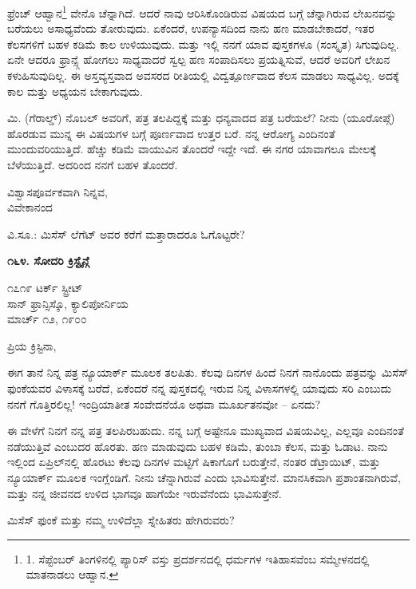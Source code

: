 ಫ್ರೆಂಚ್ ಆಹ್ವಾನ\footnote{1. ಸೆಪ್ಟೆಂಬರ್ ತಿಂಗಳಿನಲ್ಲಿ ಪ್ಯಾರಿಸ್ ವಸ್ತು ಪ್ರದರ್ಶನದಲ್ಲಿ ಧರ್ಮಗಳ ಇತಿಹಾಸವೆಂಬ ಸಮ್ಮೇಳನದಲ್ಲಿ ಮಾತನಾಡಲು ಆಹ್ವಾನ.} ವೇನೊ ಚೆನ್ನಾಗಿದೆ. ಆದರೆ ನಾವು ಆರಿಸಿಕೊಂಡಿರುವ ವಿಷಯದ ಬಗ್ಗೆ ಚೆನ್ನಾಗಿರುವ ಲೇಖನವನ್ನು ಬರೆಯಲು ಅಸಾಧ್ಯವೆಂದು ತೋರುವುದು. ಏಕೆಂದರೆ, ಉಪನ್ಯಾಸದಿಂದ ನಾನು ಹಣ ಮಾಡಬೇಕಾದರೆ, ಇತರ ಕೆಲಸಗಳಿಗೆ ಬಹಳ ಕಡಿಮೆ ಕಾಲ ಉಳಿಯುವುದು. ಮತ್ತು ಇಲ್ಲಿ ನನಗೆ ಯಾವ ಪುಸ್ತಕಗಳೂ (ಸಂಸ್ಕೃತ) ಸಿಗುವುದಿಲ್ಲ. ಏನೇ ಆದರೂ ಫ್ರಾನ್ಸ್ಗೆ ಹೋಗಲು ಸಾಧ್ಯವಾದರೆ ಸ್ವಲ್ಪ ಹಣ ಸಂಪಾದಿಸಲು ಪ್ರಯತ್ನಿಸುವೆ, ಆದರೆ ಅವರಿಗೆ ಲೇಖನ ಕಳುಹಿಸುವುದಿಲ್ಲ. ಈ ಅಸ್ತವ್ಯಸ್ತವಾದ ಅವಸರದ ರೀತಿಯಲ್ಲಿ ವಿದ್ವತ್ಪೂರ್ಣವಾದ ಕೆಲಸ ಮಾಡಲು ಸಾಧ್ಯವಿಲ್ಲ. ಅದಕ್ಕೆ ಕಾಲ ಮತ್ತು ಅಧ್ಯಯನ ಬೇಕಾಗುವುದು.

ಮಿ. (ಗೆರಾಲ್ಡ್) ನೊಬಲ್ ಅವರಿಗೆ, ಪತ್ರ ತಲಪಿದ್ದಕ್ಕೆ ಮತ್ತು ಧನ್ಯವಾದದ ಪತ್ರ ಬರೆಯಲೆ? ನೀನು (ಯೂರೋಪ್ಗೆ) ಹೊರಡುವ ಮುನ್ನ ಈ ವಿಷಯಗಳ ಬಗ್ಗೆ ಪೂರ್ಣವಾದ ಉತ್ತರ ಬರೆ. ನನ್ನ ಆರೋಗ್ಯ ಎಂದಿನಂತೆ ಮುಂದುವರಿಯುತ್ತಿದೆ. ಹೆಚ್ಚು ಕಡಿಮೆ ವಾಯುವಿನ ತೊಂದರೆ ಇದ್ದೇ ಇದೆ. ಈ ನಗರ ಯಾವಾಗಲೂ ಮೇಲಕ್ಕೆ ಬೆಳೆಯುತ್ತಿದೆ. ಅದರಿಂದ ನನಗೆ ಬಹಳ ತೊಂದರೆ.

\begin{flushright}
ವಿಶ್ವಾಸಪೂರ್ವಕವಾಗಿ ನಿನ್ನವ,\\ವಿವೇಕಾನಂದ
\end{flushright}

ವಿ.ಸೂ.: ಮಿಸೆಸ್ ಲೆಗೆಟ್ ಅವರ ಕರೆಗೆ ಮತ್ತಾರಾದರೂ ಓಗೊಟ್ಟರೇ?

\begin{center}
\textbf{೧೬೪. ಸೋದರಿ ಕ್ರಿಸ್ಟೈನ್ಗೆ}
\end{center}

\begin{flushright}
೧೭೧೯ ಟರ್ಕ್ ಸ್ಟ್ರೀಟ್\\ಸಾನ್ ಫ್ರಾನ್ಸಿಸ್ಕೊ, ಕ್ಯಾಲಿಪೋರ್ನಿಯ\\ಮಾರ್ಚ್ ೧೨, ೧೯೦೦
\end{flushright}

ಪ್ರಿಯ ಕ್ರಿಸ್ಟಿನಾ,

ಈಗ ತಾನೆ ನಿನ್ನ ಪತ್ರ ನ್ಯೂಯಾರ್ಕ್ ಮೂಲಕ ತಲಪಿತು. ಕೆಲವು ದಿನಗಳ ಹಿಂದೆ ನಿನಗೆ ನಾನೊಂದು ಪತ್ರವನ್ನು ಮಿಸೆಸ್ ಫುಂಕೆಯವರ ವಿಳಾಸಕ್ಕೆ ಬರೆದೆ, ಏಕೆಂದರೆ ನನ್ನ ಪುಸ್ತಕದಲ್ಲಿ ಇರುವ ನಿನ್ನ ವಿಳಾಸಗಳಲ್ಲಿ ಯಾವುದು ಸರಿ ಎಂಬುದು ನನಗೆ ಗೊತ್ತಿರಲಿಲ್ಲ! ಇಂದ್ರಿಯಾತೀತ ಸಂವೇದನೆಯೊ ಅಥವಾ ಮೂರ್ಖತನವೋ – ಏನದು?

ಈ ವೇಳೆಗೆ ನಿನಗೆ ನನ್ನ ಪತ್ರ ತಲಪಿರಬಹುದು. ನನ್ನ ಬಗ್ಗೆ ಅಷ್ಟೇನೂ ಮುಖ್ಯವಾದ ವಿಷಯವಿಲ್ಲ, ಎಲ್ಲವೂ ಎಂದಿನಂತೆ ನಡೆಯುತ್ತಿವೆ ಎಂಬುದರ ಹೊರತು. ಹಣ ಮಾಡುವುದು ಬಹಳ ಕಡಿಮೆ, ತುಂಬಾ ಕೆಲಸ, ಮತ್ತು ಓಡಾಟ. ನಾನು ಇಲ್ಲಿಂದ ಏಪ್ರಿಲ್‌ನಲ್ಲಿ ಹೊರಟು ಕೆಲವು ದಿನಗಳ ಮಟ್ಟಿಗೆ ಷಿಕಾಗೊಗೆ ಬರುತ್ತೇನೆ, ನಂತರ ಡೆಟ್ರಾಯಿಟ್, ಮತ್ತು ನ್ಯೂಯಾರ್ಕ್ ಮೂಲಕ ಇಂಗ್ಲೆಂಡಿಗೆ. ನೀನು ಚೆನ್ನಾಗಿರುವೆ ಎಂದು ಭಾವಿಸುತ್ತೇನೆ. ಮಾನಸಿಕವಾಗಿ ಪ್ರಶಾಂತನಾಗಿರುವೆ, ಮತ್ತು ನನ್ನ ಜೀವನದ ಉಳಿದ ಭಾಗವೂ ಹಾಗೆಯೇ ಇರುವೆನೆಂದು ಭಾವಿಸುತ್ತೇನೆ.

ಮಿಸೆಸ್ ಫುಂಕೆ ಮತ್ತು ನಮ್ಮ ಉಳಿದೆಲ್ಲಾ ಸ್ನೇಹಿತರು ಹೇಗಿರುವರು?

